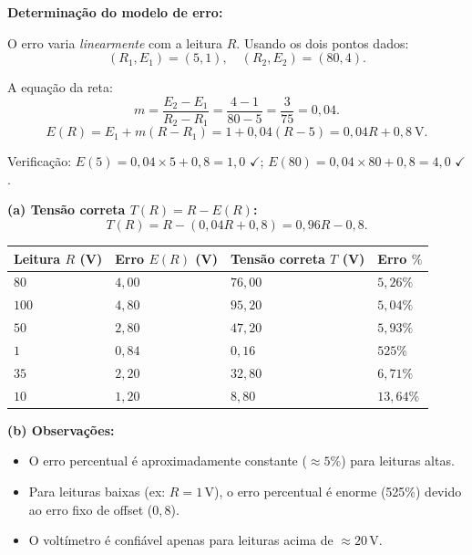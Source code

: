 \textbf{Determinação do modelo de erro:}

O erro varia \emph{linearmente} com a leitura $R$. Usando os dois pontos dados:
\[
(R_1, E_1)=(5,1),\quad (R_2, E_2)=(80,4).
\]

A equação da reta:
\[
m=\frac{E_2-E_1}{R_2-R_1}=\frac{4-1}{80-5}=\frac{3}{75}=0{,}04.
\]
\[
E(R)=E_1+m(R-R_1)=1+0{,}04(R-5)=0{,}04R+0{,}8\ \mathrm{V}.
\]

Verificação: $E(5)=0{,}04\times5+0{,}8=1{,}0$ $\checkmark$; $E(80)=0{,}04\times80+0{,}8=4{,}0$ $\checkmark$.

\textbf{(a) Tensão correta $T(R)=R-E(R)$:}
\[
T(R)=R-(0{,}04R+0{,}8)=0{,}96R-0{,}8.
\]

\begin{center}
\begin{tabular}{llll}
\hline
Leitura $R$ (V) & Erro $E(R)$ (V) & Tensão correta $T$ (V) & Erro $\%$ \\
\hline
$80$ & $4{,}00$ & $76{,}00$ & $5{,}26\%$ \\
$100$ & $4{,}80$ & $95{,}20$ & $5{,}04\%$ \\
$50$ & $2{,}80$ & $47{,}20$ & $5{,}93\%$ \\
$1$ & $0{,}84$ & $0{,}16$ & $525\%$ \\
$35$ & $2{,}20$ & $32{,}80$ & $6{,}71\%$ \\
$10$ & $1{,}20$ & $8{,}80$ & $13{,}64\%$ \\
\hline
\end{tabular}
\end{center}

\textbf{(b) Observações:}
\begin{itemize}
\item O erro percentual é aproximadamente constante ($\approx5\%$) para leituras altas.
\item Para leituras baixas (ex: $R=1\,\mathrm{V}$), o erro percentual é enorme (525\%) devido ao erro fixo de offset ($0{,}8$).
\item O voltímetro é confiável apenas para leituras acima de $\approx20\,\mathrm{V}$.
\end{itemize}